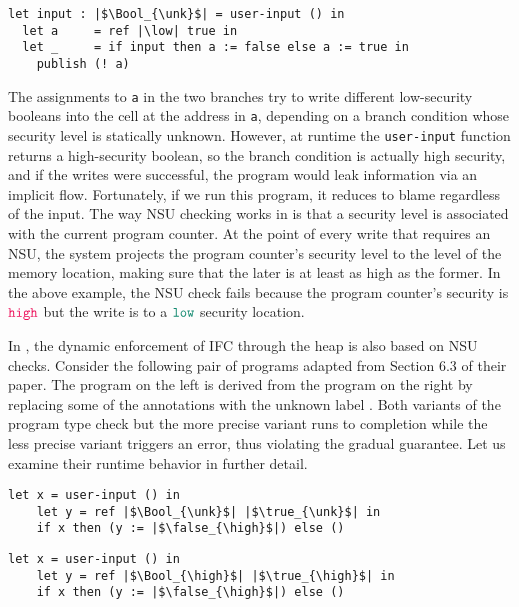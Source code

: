 \begin{lstlisting}[style=tt]
  let input : |$\Bool_{\unk}$| = user-input () in
  let a     = ref |\low| true in
  let _     = if input then a := false else a := true in
    publish (! a)
\end{lstlisting}

\noindent
The assignments to \texttt{a} in the two branches try to write different
low-security booleans into the cell at the address in \texttt{a}, depending on a
branch condition whose security level is statically unknown. However, at runtime
the \texttt{user-input} function returns a high-security boolean, so the branch
condition is actually high security, and if the writes were successful, the
program would leak information via an implicit flow. Fortunately, if we run this
program, it reduces to blame regardless of the input. The way NSU checking works
in \Surface is that a security level is associated with the current program
counter. At the point of every write that requires an NSU, the system projects
the program counter's security level to the level of the memory location, making
sure that the later is at least as high as the former. In the above example, the
NSU check fails because the program counter's security is $\high$ but the write
is to a $\low$ security location.

In \GSLRef \parencite{Toro:2018aa}, the dynamic enforcement of IFC through the
heap is also based on NSU checks. Consider the following pair of programs
adapted from Section 6.3 of their paper. The program on the left is derived from
the program on the right by replacing some of the {\high} annotations with the
unknown label \unk. Both variants of the program type check but the more precise
variant runs to completion while the less precise variant triggers an error,
thus violating the gradual guarantee. Let us examine their runtime behavior in
further detail.

\begin{multicols}{2}
  \small
  \noindent
  \begin{lstlisting}[style=tt,basicstyle=\ttfamily\footnotesize]
    let x = user-input () in
    let y = ref |$\Bool_{\unk}$| |$\true_{\unk}$| in
    if x then (y := |$\false_{\high}$|) else ()
  \end{lstlisting}
  \columnbreak
  \begin{lstlisting}[style=tt,basicstyle=\ttfamily\footnotesize]
    let x = user-input () in
    let y = ref |$\Bool_{\high}$| |$\true_{\high}$| in
    if x then (y := |$\false_{\high}$|) else ()
  \end{lstlisting}
\end{multicols}


